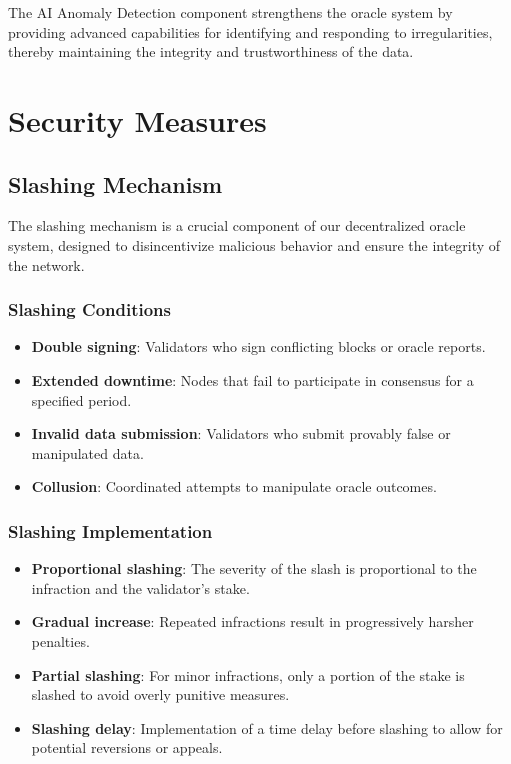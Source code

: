 \documentclass[12pt,a4paper]{article}
\begin{document}
	The AI Anomaly Detection component strengthens the oracle system by providing advanced capabilities for identifying and responding to irregularities, thereby maintaining the integrity and trustworthiness of the data.
	
	
	
	\section{Security Measures}
	
	
	\subsection{Slashing Mechanism}
	The slashing mechanism is a crucial component of our decentralized oracle system, designed to disincentivize malicious behavior and ensure the integrity of the network.
	
	\subsubsection{Slashing Conditions}
	\begin{itemize}
		\item \textbf{Double signing}: Validators who sign conflicting blocks or oracle reports.
		\item \textbf{Extended downtime}: Nodes that fail to participate in consensus for a specified period.
		\item \textbf{Invalid data submission}: Validators who submit provably false or manipulated data.
		\item \textbf{Collusion}: Coordinated attempts to manipulate oracle outcomes.
	\end{itemize}
	
	\subsubsection{Slashing Implementation}
	\begin{itemize}
		\item \textbf{Proportional slashing}: The severity of the slash is proportional to the infraction and the validator's stake.
		\item \textbf{Gradual increase}: Repeated infractions result in progressively harsher penalties.
		\item \textbf{Partial slashing}: For minor infractions, only a portion of the stake is slashed to avoid overly punitive measures.
		\item \textbf{Slashing delay}: Implementation of a time delay before slashing to allow for potential reversions or appeals.
	\end{itemize}
	
\end{document}
